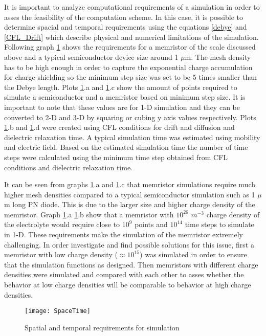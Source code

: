 \begin{doublespace}
It is important to analyze computational requirements of a simulation in order to asses the feasibility of the computation scheme. In this case, it is possible to determine spacial and temporal requirements using the equations \ref{debye} and \ref{CFL_Drift} which describe physical and numerical limitations of the simulation. Following graph \ref{SpaceTime} shows the requirements for a memristor of the scale discussed above and a typical semiconductor device size around 1 $\mu$m. The mesh density has to be high enough in order to capture the exponential charge accumulation for charge shielding so the minimum step size was set to be 5 times smaller than the Debye length. Plots \ref{SpaceTime}.a and \ref{SpaceTime}.c show the amount of points required to simulate a semiconductor and a memristor based on minimum step size. It is important to note that these values are for 1-D simulation and they can be converted to 2-D and 3-D by squaring or cubing y axis values respectively. Plots \ref{SpaceTime}.b and \ref{SpaceTime}.d were created using CFL conditions for drift and diffusion and dielectric relaxation time. A typical simulation time was estimated using mobility and electric field. Based on the estimated simulation time the number of time steps were calculated using the minimum time step obtained from CFL conditions and dielectric relaxation time.

It can be seen from graphs \ref{SpaceTime}.a and \ref{SpaceTime}.c that memristor simulations require much higher mesh densities compared to a typical semiconductor simulation such as 1 $\mu$m long PN diode. This is due to the larger size and higher charge density of the memristor. Graph \ref{SpaceTime}.a \ref{SpaceTime}.b show that a memristor with $10^{26}$ $m^{-3}$ charge density of the electrolyte would require close to $10^9$ points and $10^{14}$ time steps to simulate in 1-D. These requirements make the simulation of the memristor extremely challenging. In order investigate and find possible solutions for this issue, first a memristor with low charge density ($\approx 10^{15}$) was simulated in order to ensure that the simulation functions as designed. Then memristors with different charge densities were simulated and compared with each other to asses whether the behavior at low charge densities will be comparable to behavior at high charge densities.

\begin{landscape}
\begin{figure}[htp]
\centering
\texttt{[image: SpaceTime]}
\caption{Spatial and temporal requirements for simulation} 
\label{SpaceTime}
\end{figure}
\end{landscape}



\end{doublespace}
